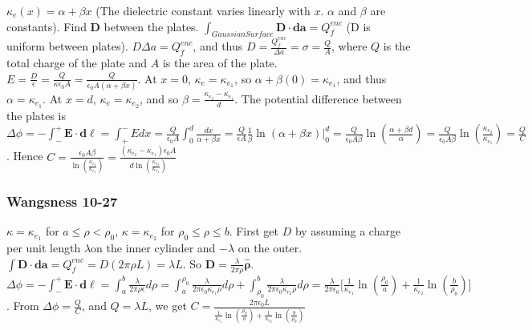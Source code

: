 \documentclass[oneside]{book}
\theoremstyle{definition}
\newcommand*\B[1]{\mathbf{#1}}
\newcommand*\Bh[1]{\mathbf{\hat{#1}}}
\begin{document}
$\kappa_e(x) = \alpha+\beta x$ (The dielectric constant varies linearly with $x$. $\alpha$ and $\beta$ are constants). Find $\B{D}$ between the plates. $\int_{Gaussian Surface} \B{D}\cdot \B{da} = Q_f^{enc}$ (D is uniform between plates). $D\Delta a = Q_f^{enc}$, and thus $D = \frac{Q_f^{enc}}{\Delta a} = \sigma = \frac{Q}{A}$, where $Q$ is the total charge of the plate and $A$ is the area of the plate. $E = \frac{D}{\epsilon} = \frac{Q}{\kappa \epsilon_0 A} = \frac{Q}{\epsilon_0 A(\alpha + \beta x)}$. At $x=0$, $\kappa_e = \kappa_{e_1}$, so $\alpha+\beta(0) = \kappa_{e_1}$, and thus $\alpha = \kappa_{e_1}$. At $x=d$, $\kappa_{e} = \kappa_{e_2}$, and so $\beta = \frac{\kappa_{e_2}-\kappa_{e_1}}{d}$. The potential difference between the plates is $\Delta \phi = -\int_{-}^{+} \B{E}\cdot \B{d\ell} = \int_{+}^{-} Edx = \frac{Q}{\epsilon_0 A} \int_{0}^{d} \frac{dx}{\alpha+\beta x} = \frac{Q}{\epsilon A} \frac{1}{\beta} \ln(\alpha+\beta x)\big|_{0}^{d} = \frac{Q}{\epsilon_0 A\beta} \ln(\frac{\alpha+\beta d}{\alpha}) = \frac{Q}{\epsilon_0 A\beta} \ln(\frac{\kappa_{e_2}}{\kappa_{e_1}}) = \frac{Q}{C}$. Hence $C = \frac{\epsilon_0 A\beta}{\ln(\frac{\kappa_{e_2}}{\kappa_{e_1}})} = \frac{(\kappa_{e_2}-\kappa_{e_1})\epsilon_0 A}{d\ln(\frac{\kappa_{e_2}}{\kappa_{e_1}})}$

\begin{figure}[!h]
  \centering
  \hfill
    \centering
\end{figure}


\subsubsection{Wangsness 10-27}
$\kappa = \kappa_{e_1}$ for $a\leq \rho < \rho_0$, $\kappa = \kappa_{e_2}$ for $\rho_0 \leq \rho \leq b$. First get $D$ by assuming a charge per unit length $\lambda $on the inner cylinder and $-\lambda$ on the outer. $\int \B{D}\cdot \B{da} = Q_{f}^{enc} = D(2\pi \rho L) = \lambda L$. So $\B{D} = \frac{\lambda}{2\pi \rho} \Bh{\rho}$. $\Delta \phi = -\int_{-}^{+} \B{E} \cdot \B{d\ell} = \int_{a}^{b} \frac{\lambda}{2\pi \rho \epsilon}d\rho = \int_{a}^{\rho_0} \frac{\lambda}{2\pi \epsilon_0 \kappa_{e_1}\rho}d\rho + \int_{\rho_0}^{b} \frac{\lambda}{2\pi \epsilon_0 \kappa_{e_2}\rho}d\rho = \frac{\lambda}{2\pi \epsilon_0}\big[\frac{1}{\kappa_{e_1}}\ln(\frac{\rho_0}{a}) + \frac{1}{\kappa_{e_2}}\ln(\frac{b}{\rho_0})\big]$. From $\Delta \phi = \frac{Q}{C}$, and $Q=\lambda L$, we get $C = \frac{2\pi \epsilon_0 L}{\frac{1}{\kappa_{e_1}}\ln(\frac{\rho_0}{a}) + \frac{1}{\kappa_{e_2}}\ln(\frac{b}{\rho_0})}$
\end{document}
